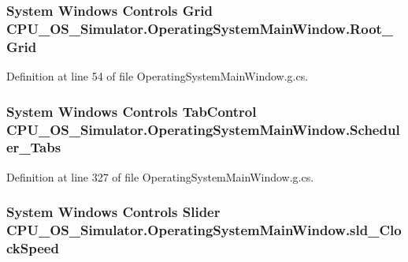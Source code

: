 \subsubsection[{Root\+\_\+\+Grid}]{\setlength{\rightskip}{0pt plus 5cm}System Windows Controls Grid C\+P\+U\+\_\+\+O\+S\+\_\+\+Simulator.\+Operating\+System\+Main\+Window.\+Root\+\_\+\+Grid\hspace{0.3cm}{\ttfamily [package]}}\label{class_c_p_u___o_s___simulator_1_1_operating_system_main_window_aaa4cd76a5ec5398ec2feacccbe5208b4}


Definition at line 54 of file Operating\+System\+Main\+Window.\+g.\+cs.

\hypertarget{class_c_p_u___o_s___simulator_1_1_operating_system_main_window_a2575de899df7277ae9c310931b8dbaa0}{}
\subsubsection[{Scheduler\+\_\+\+Tabs}]{\setlength{\rightskip}{0pt plus 5cm}System Windows Controls Tab\+Control C\+P\+U\+\_\+\+O\+S\+\_\+\+Simulator.\+Operating\+System\+Main\+Window.\+Scheduler\+\_\+\+Tabs\hspace{0.3cm}{\ttfamily [package]}}\label{class_c_p_u___o_s___simulator_1_1_operating_system_main_window_a2575de899df7277ae9c310931b8dbaa0}


Definition at line 327 of file Operating\+System\+Main\+Window.\+g.\+cs.

\hypertarget{class_c_p_u___o_s___simulator_1_1_operating_system_main_window_a21bd388b7e1e821db2bfcee90530c3ae}{}
\subsubsection[{sld\+\_\+\+Clock\+Speed}]{\setlength{\rightskip}{0pt plus 5cm}System Windows Controls Slider C\+P\+U\+\_\+\+O\+S\+\_\+\+Simulator.\+Operating\+System\+Main\+Window.\+sld\+\_\+\+Clock\+Speed}\label{class_c_p_u___o_s___simulator_1_1_operating_system_main_window_a21bd388b7e1e821db2bfcee90530c3ae}


